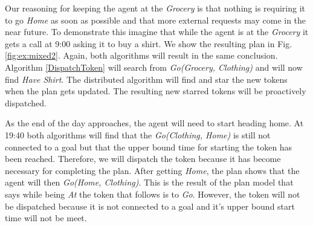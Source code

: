 Our reasoning for keeping the agent at the {\em Grocery} is that nothing is requiring it to go {\em Home}
as soon as possible and that more external requests may come in the near future. To demonstrate this imagine 
that while the agent is at the {\em Grocery} it gets a call at 9:00 asking it to buy a shirt.  We show the resulting plan 
in Fig. \ref{fig:ex:mixed2}. Again, both algorithms will result in the same conclusion. Algorithm \ref{DispatchToken}
will search from {\em Go(Grocery, Clothing)} and will now find {\em Have Shirt}. The distributed algorithm will find
and star the new tokens when the plan gets updated. The resulting new starred tokens will be proactively dispatched.

As the end of the day approaches, the agent will need to start heading home. At 19:40 both algorithms will find
that the {\em Go(Clothing, Home)} is still not connected to a goal but that the upper bound time for starting the token
has been reached. Therefore, we will dispatch the token because it has become necessary for completing the plan.
After getting {\em Home}, the plan shows that the agent will then {\em Go(Home, Clothing)}. This is the result of the plan model
that says while being {\em At} the token that follows is to {\em Go}. However, the token
will not be dispatched because it is not connected to a goal and it's upper bound start time will not be meet.



